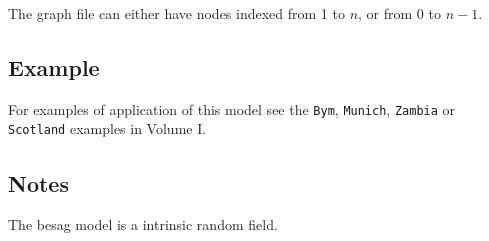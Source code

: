 \documentclass[a4paper,11pt]{article}
\begin{document}
The graph file can either have nodes indexed from 1 to $n$, or from 0
to $n-1$.



\subsection*{Example}

For examples of application of this model see the {\tt Bym}, {\tt Munich}, {\tt Zambia} or {\tt Scotland} examples in Volume I.

\subsection*{Notes}

The besag model is a intrinsic random field.
\end{document}
